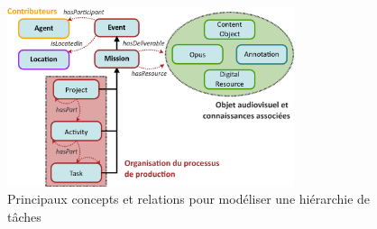 \begin{figure}[ht!]
\centering
\includegraphics[width=0.75\textwidth]{./images/MOD-Process-v2.png}
\caption{Principaux concepts et relations pour modéliser une hiérarchie de tâches}
\label{img:cr-event}
\end{figure}



